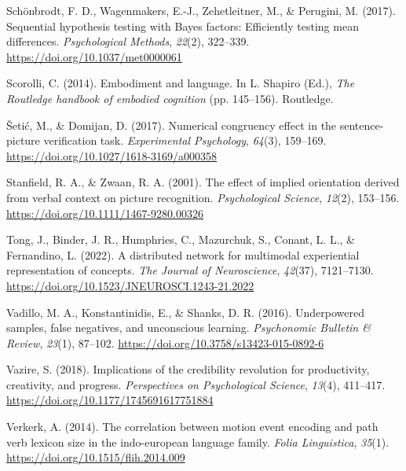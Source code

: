 \documentclass[
  man,mask,floatsintext]{apa7}
\newlength{\cslhangindent}
\newlength{\cslentryspacingunit} %
\newenvironment{CSLReferences}[2] %
 {%
  \setlength{\parindent}{0pt}
  \ifodd #1
  \let\oldpar\par
  \def\par{\hangindent=\cslhangindent\oldpar}
  \fi
  \setlength{\parskip}{#2\cslentryspacingunit}
 }%
 {}
\begin{document}
\begin{CSLReferences}{1}{0}
\leavevmode{}%
Schönbrodt, F. D., Wagenmakers, E.-J., Zehetleitner, M., \& Perugini, M. (2017). Sequential hypothesis testing with {Bayes} factors: {Efficiently} testing mean differences. \emph{Psychological Methods}, \emph{22}(2), 322--339. \url{https://doi.org/10.1037/met0000061}

\leavevmode{}%
Scorolli, C. (2014). Embodiment and language. In L. Shapiro (Ed.), \emph{The {Routledge} handbook of embodied cognition} (pp. 145--156). {Routledge}.

\leavevmode{}%
Šetić, M., \& Domijan, D. (2017). Numerical {congruency effect} in the {sentence-picture verification task}. \emph{Experimental Psychology}, \emph{64}(3), 159--169. \url{https://doi.org/10.1027/1618-3169/a000358}

\leavevmode{}%
Stanfield, R. A., \& Zwaan, R. A. (2001). The effect of implied orientation derived from verbal context on picture recognition. \emph{Psychological Science}, \emph{12}(2), 153--156. \url{https://doi.org/10.1111/1467-9280.00326}

\leavevmode{}%
Tong, J., Binder, J. R., Humphries, C., Mazurchuk, S., Conant, L. L., \& Fernandino, L. (2022). A distributed network for multimodal experiential representation of concepts. \emph{The Journal of Neuroscience}, \emph{42}(37), 7121--7130. \url{https://doi.org/10.1523/JNEUROSCI.1243-21.2022}

\leavevmode{}%
Vadillo, M. A., Konstantinidis, E., \& Shanks, D. R. (2016). Underpowered samples, false negatives, and unconscious learning. \emph{Psychonomic Bulletin \& Review}, \emph{23}(1), 87--102. \url{https://doi.org/10.3758/s13423-015-0892-6}

\leavevmode{}%
Vazire, S. (2018). Implications of the credibility revolution for productivity, creativity, and progress. \emph{Perspectives on Psychological Science}, \emph{13}(4), 411--417. \url{https://doi.org/10.1177/1745691617751884}

\leavevmode{}%
Verkerk, A. (2014). The correlation between motion event encoding and path verb lexicon size in the indo-european language family. \emph{Folia Linguistica}, \emph{35}(1). \url{https://doi.org/10.1515/flih.2014.009}


\end{CSLReferences}
\end{document}
